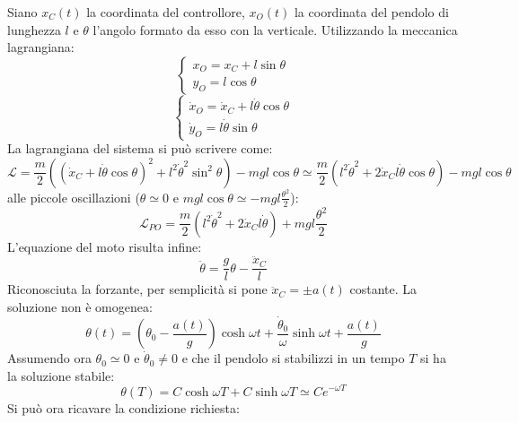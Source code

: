 \documentclass[12pt, a4paper]{book}
\theoremstyle{theorem}
\begin{document}
				Siano $x_{C}(t)$ la coordinata del controllore, $x_{O}(t)$ la coordinata del pendolo di lunghezza $l$ e $\theta$ l'angolo formato da esso con la verticale.
				Utilizzando la meccanica lagrangiana:
				\begin{equation*}
					\begin{cases}
						x_{O}=x_{C}+l\sin\theta\\
						y_{O}=l\cos\theta
					\end{cases}
				\end{equation*}
				\begin{equation*}
					\begin{cases}
						\dot{x}_O=\dot{x}_{C}+l\dot{\theta}\cos\theta\\
						\dot{y}_{O}=l\dot{\theta}\sin\theta
					\end{cases}
				\end{equation*}
				La lagrangiana del sistema si può scrivere come:
				\begin{equation*}
					\mathcal{L}=\frac{m}{2}\left( \left( \dot{x}_{C}+l\dot{\theta}\cos\theta \right)^2 + l^2\dot{\theta}^2\sin^2\theta \right) - mgl\cos\theta \simeq \frac{m}{2}\left( l^2\dot{\theta}^2 + 2\dot{x}_{C}l\dot{\theta}\cos\theta \right) - mgl\cos\theta
				\end{equation*}
				alle piccole oscillazioni ($\theta\simeq 0$ e $mgl\cos\theta\simeq -mgl\frac{\theta^2}{2}$):
				\begin{equation*}
					\mathcal{L}_{PO}=\frac{m}{2}\left( l^2\dot{\theta}^2 + 2\dot{x}_{C}l\dot{\theta} \right) + mgl\frac{\theta^2}{2}
				\end{equation*}
				L'equazione del moto risulta infine:
				\begin{equation}
					\ddot{\theta}=\frac{g}{l}\theta - \frac{\ddot{x}_C}{l}
				\end{equation}
				Riconosciuta la forzante, per semplicità si pone $\ddot{x}_C=\pm a(t)$ costante.
				La soluzione non è omogenea:
				\begin{equation*}
					\theta(t)=\left( \theta_{0} -\frac{a(t)}{g} \right)\cosh\omega t + \frac{\dot{\theta}_0}{\omega}\sinh\omega t +\frac{a(t)}{g}
				\end{equation*}
				Assumendo ora $\theta_0\simeq 0$ e $\dot{\theta}_0\neq 0$ e che il pendolo si stabilizzi in un tempo $T$ si ha la soluzione stabile:
				\begin{equation*}
					\theta(T)=C\cosh\omega T + C\sinh\omega T \simeq Ce^{-\omega T}
				\end{equation*}
				Si può ora ricavare la condizione richiesta:
\end{document}
